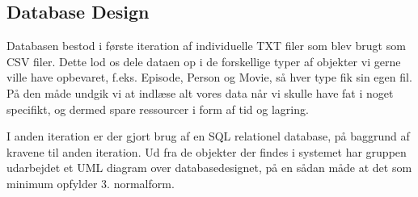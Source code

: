 \subsection{Database Design}
Databasen bestod i første iteration af individuelle TXT filer som blev brugt som CSV filer. Dette lod os dele dataen op i de forskellige typer af objekter vi gerne ville have opbevaret, f.eks. Episode, Person og Movie, så hver type fik sin egen fil. På den måde undgik vi at indlæse alt vores data når vi skulle have fat i noget specifikt, og dermed spare ressourcer i form af tid og lagring.

I anden iteration er der gjort brug af en SQL relationel database, på baggrund af kravene til anden iteration. Ud fra de objekter der findes i systemet har gruppen udarbejdet et UML diagram over databasedesignet, på en sådan måde at det som minimum opfylder 3. normalform. 

